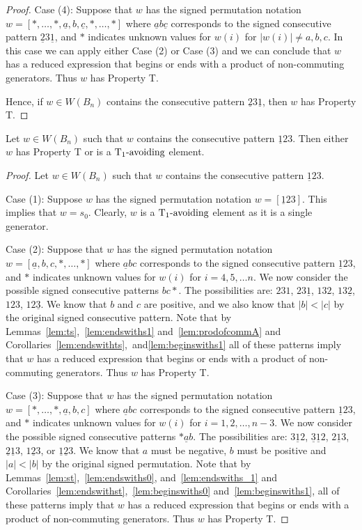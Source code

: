\begin{lemma}
\begin{proof}
	Case (4): Suppose that $w$ has the signed permutation notation $w=[\ast, \ldots,\ast, \underline{a},b,\underline{c}, \ast, \ldots, \ast]$ where $\underline{a}b\underline{c}$ corresponds to the signed consecutive pattern $\underline{2}3\underline{1}$, and $\ast$ indicates unknown values for $w(i)$ for $|w(i)|\neq a,b,c$. In this case we can apply either Case (2) or Case (3) and we can conclude that $w$ has a reduced expression that begins or ends with a product of non-commuting generators. Thus $w$ has Property T.

	Hence, if $w \in W(B_n)$ contains the consecutive pattern $\underline{2}3\underline{1}$, then $w$ has Property T.
\end{proof}	
\end{lemma}

\begin{lemma}\label{lem:123}
Let $w \in W(B_n)$ such that $w$ contains the consecutive pattern $\underline{1}23$. Then either $w$ has Property T or is a $\operatorname{T_1-\mathrm{avoiding}}$ element.
\begin{proof}
	Let $w \in W(B_n)$ such that $w$ contains the consecutive pattern $\underline{1}23$.
	
	Case (1): Suppose $w$ has the signed permutation notation $w=[\underline{1}23]$. This implies that $w=s_0$. Clearly, $w$ is a $\operatorname{T_1-\mathrm{avoiding}}$ element as it is a single generator.
	
	Case (2): Suppose that $w$ has the signed permutation notation $w=[\underline{a},b,c, \ast, \ldots, \ast]$ where $\underline{a}bc$ corresponds to the signed consecutive pattern $\underline{1}23$, and $\ast$ indicates unknown values for $w(i)$ for $i=4,5, \ldots n$. We now consider the possible signed consecutive patterns $bc \ast$. The possibilities are: $231$, $23 \underline{1}$, $132$, $13 \underline{2}$, $123$, $12 \underline{3}$. We know that $b$ and $c$ are positive, and we also know that $|b|<|c|$ by the original signed consecutive pattern. Note that by Lemmas~\ref{lem:ts},~\ref{lem:endswiths1} and~\ref{lem:prodofcommA} and Corollaries~\ref{lem:endswithts},~and\ref{lem:beginswiths1} all of these patterns imply that $w$ has a reduced expression that begins or ends with a product of non-commuting generators. Thus $w$ has Property T.
	
	Case (3): Suppose that $w$ has the signed permutation notation $w=[\ast, \ldots, \ast, \underline{a},b,c]$ where $\underline{a}bc$ corresponds to the signed consecutive pattern $\underline{1}23$, and $\ast$ indicates unknown values for $w(i)$ for $i=1,2, \ldots ,n-3$. We now consider the possible signed consecutive patterns $\ast \underline{a} b$. The possibilities are: $3 \underline{1} 2$, $\underline{3} \underline{1} 2$, $2 \underline{1} 3$, $\underline{2} \underline{1} 3$, $1 \underline{2} 3$, or $\underline{1} \underline{2} 3$. We know that $a$ must be negative, $b$ must be positive and $|a|<|b|$ by the original signed permutation. Note that by Lemmas~\ref{lem:st},~\ref{lem:endswiths0}, and~\ref{lem:endswiths_1} and Corollaries~\ref{lem:endswithst},~\ref{lem:beginswiths0} and~\ref{lem:beginswiths1}, all of these patterns imply that $w$ has a reduced expression that begins or ends with a product of non-commuting generators. Thus $w$ has Property T. 
	

\end{proof}
\end{lemma}
